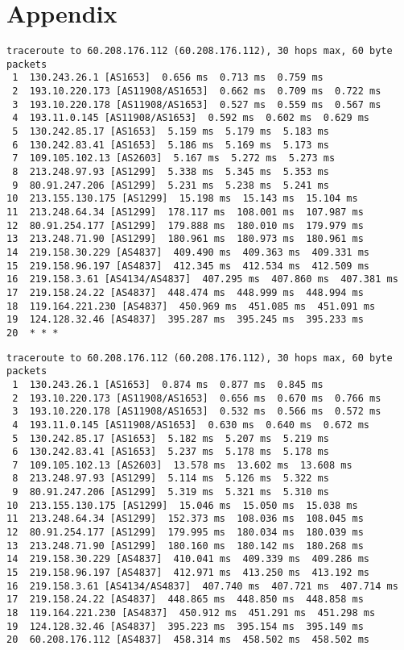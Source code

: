 \documentclass[runningheads,a4paper]{llncs}
\begin{document}
\appendix
\section{Appendix}
\begin{lstlisting}[basicstyle=\scriptsize\ttfamily,captionpos=b,caption={Traceroute during scan.},label=lst:tr1]
traceroute to 60.208.176.112 (60.208.176.112), 30 hops max, 60 byte packets
 1  130.243.26.1 [AS1653]  0.656 ms  0.713 ms  0.759 ms
 2  193.10.220.173 [AS11908/AS1653]  0.662 ms  0.709 ms  0.722 ms
 3  193.10.220.178 [AS11908/AS1653]  0.527 ms  0.559 ms  0.567 ms
 4  193.11.0.145 [AS11908/AS1653]  0.592 ms  0.602 ms  0.629 ms
 5  130.242.85.17 [AS1653]  5.159 ms  5.179 ms  5.183 ms
 6  130.242.83.41 [AS1653]  5.186 ms  5.169 ms  5.173 ms
 7  109.105.102.13 [AS2603]  5.167 ms  5.272 ms  5.273 ms
 8  213.248.97.93 [AS1299]  5.338 ms  5.345 ms  5.353 ms
 9  80.91.247.206 [AS1299]  5.231 ms  5.238 ms  5.241 ms
10  213.155.130.175 [AS1299]  15.198 ms  15.143 ms  15.104 ms
11  213.248.64.34 [AS1299]  178.117 ms  108.001 ms  107.987 ms
12  80.91.254.177 [AS1299]  179.888 ms  180.010 ms  179.979 ms
13  213.248.71.90 [AS1299]  180.961 ms  180.973 ms  180.961 ms
14  219.158.30.229 [AS4837]  409.490 ms  409.363 ms  409.331 ms
15  219.158.96.197 [AS4837]  412.345 ms  412.534 ms  412.509 ms
16  219.158.3.61 [AS4134/AS4837]  407.295 ms  407.860 ms  407.381 ms
17  219.158.24.22 [AS4837]  448.474 ms  448.999 ms  448.994 ms
18  119.164.221.230 [AS4837]  450.969 ms  451.085 ms  451.091 ms
19  124.128.32.46 [AS4837]  395.287 ms  395.245 ms  395.233 ms
20  * * *
\end{lstlisting}

\begin{lstlisting}[basicstyle=\scriptsize\ttfamily,captionpos=b,caption={Traceroute after scan.},label=lst:tr2]
traceroute to 60.208.176.112 (60.208.176.112), 30 hops max, 60 byte packets
 1  130.243.26.1 [AS1653]  0.874 ms  0.877 ms  0.845 ms
 2  193.10.220.173 [AS11908/AS1653]  0.656 ms  0.670 ms  0.766 ms
 3  193.10.220.178 [AS11908/AS1653]  0.532 ms  0.566 ms  0.572 ms
 4  193.11.0.145 [AS11908/AS1653]  0.630 ms  0.640 ms  0.672 ms
 5  130.242.85.17 [AS1653]  5.182 ms  5.207 ms  5.219 ms
 6  130.242.83.41 [AS1653]  5.237 ms  5.178 ms  5.178 ms
 7  109.105.102.13 [AS2603]  13.578 ms  13.602 ms  13.608 ms
 8  213.248.97.93 [AS1299]  5.114 ms  5.126 ms  5.322 ms
 9  80.91.247.206 [AS1299]  5.319 ms  5.321 ms  5.310 ms
10  213.155.130.175 [AS1299]  15.046 ms  15.050 ms  15.038 ms
11  213.248.64.34 [AS1299]  152.373 ms  108.036 ms  108.045 ms
12  80.91.254.177 [AS1299]  179.995 ms  180.034 ms  180.039 ms
13  213.248.71.90 [AS1299]  180.160 ms  180.142 ms  180.268 ms
14  219.158.30.229 [AS4837]  410.041 ms  409.339 ms  409.286 ms
15  219.158.96.197 [AS4837]  412.971 ms  413.250 ms  413.192 ms
16  219.158.3.61 [AS4134/AS4837]  407.740 ms  407.721 ms  407.714 ms
17  219.158.24.22 [AS4837]  448.865 ms  448.850 ms  448.858 ms
18  119.164.221.230 [AS4837]  450.912 ms  451.291 ms  451.298 ms
19  124.128.32.46 [AS4837]  395.223 ms  395.154 ms  395.149 ms
20  60.208.176.112 [AS4837]  458.314 ms  458.502 ms  458.502 ms
\end{lstlisting}
\end{document}
